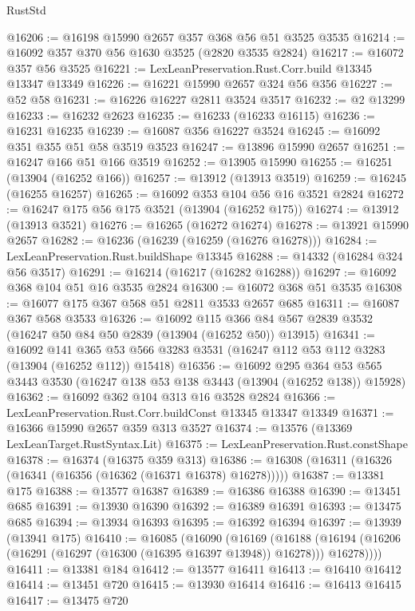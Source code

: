 \begin{lexlean}{RustStd}
\begin{coremodule}
@16206 := @16198 @15990 @2657 @357 @368 @56 @51 @3525 @3535
@16214 := @16092 @357 @370 @56 @1630 @3525 (@2820 @3535 @2824)
@16217 := @16072 @357 @56 @3525
@16221 := LexLeanPreservation.Rust.Corr.build @13345 @13347 @13349
@16226 := @16221 @15990 @2657 @324 @56 @356
@16227 := @52 @58
@16231 := @16226 @16227 @2811 @3524 @3517
@16232 := @2 @13299
@16233 := @16232 @2623
@16235 := @16233 (@16233 @16115)
@16236 := @16231 @16235
@16239 := @16087 @356 @16227 @3524
@16245 := @16092 @351 @355 @51 @58 @3519 @3523
@16247 := @13896 @15990 @2657
@16251 := @16247 @166 @51 @166 @3519
@16252 := @13905 @15990
@16255 := @16251 (@13904 (@16252 @166))
@16257 := @13912 (@13913 @3519)
@16259 := @16245 (@16255 @16257)
@16265 := @16092 @353 @104 @56 @16 @3521 @2824
@16272 := @16247 @175 @56 @175 @3521 (@13904 (@16252 @175))
@16274 := @13912 (@13913 @3521)
@16276 := @16265 (@16272 @16274)
@16278 := @13921 @15990 @2657
@16282 := @16236 (@16239 (@16259 (@16276 @16278)))
@16284 := LexLeanPreservation.Rust.buildShape @13345
@16288 := @14332 (@16284 @324 @56 @3517)
@16291 := @16214 (@16217 (@16282 @16288))
@16297 := @16092 @368 @104 @51 @16 @3535 @2824
@16300 := @16072 @368 @51 @3535
@16308 := @16077 @175 @367 @568 @51 @2811 @3533 @2657 @685
@16311 := @16087 @367 @568 @3533
@16326 := @16092
    @115
    @366
    @84
    @567
    @2839
    @3532
    (@16247 @50 @84 @50 @2839 (@13904 (@16252 @50)) @13915)
@16341 := @16092
    @141
    @365
    @53
    @566
    @3283
    @3531
    (@16247 @112 @53 @112 @3283 (@13904 (@16252 @112)) @15418)
@16356 := @16092
    @295
    @364
    @53
    @565
    @3443
    @3530
    (@16247 @138 @53 @138 @3443 (@13904 (@16252 @138)) @15928)
@16362 := @16092 @362 @104 @313 @16 @3528 @2824
@16366 := LexLeanPreservation.Rust.Corr.buildConst @13345 @13347 @13349
@16371 := @16366 @15990 @2657 @359 @313 @3527
@16374 := @13576 (@13369 LexLeanTarget.RustSyntax.Lit)
@16375 := LexLeanPreservation.Rust.constShape
@16378 := @16374 (@16375 @359 @313)
@16386 := @16308 (@16311 (@16326 (@16341 (@16356 (@16362 (@16371 @16378) @16278)))))
@16387 := @13381 @175
@16388 := @13577 @16387
@16389 := @16386 @16388
@16390 := @13451 @685
@16391 := @13930 @16390
@16392 := @16389 @16391
@16393 := @13475 @685
@16394 := @13934 @16393
@16395 := @16392 @16394
@16397 := @13939 (@13941 @175)
@16410 := @16085
    (@16090
      (@16169
        (@16188 (@16194 (@16206 (@16291 (@16297 (@16300 (@16395 @16397 @13948)) @16278))) @16278))))
@16411 := @13381 @184
@16412 := @13577 @16411
@16413 := @16410 @16412
@16414 := @13451 @720
@16415 := @13930 @16414
@16416 := @16413 @16415
@16417 := @13475 @720

\end{coremodule}
\end{lexlean}
